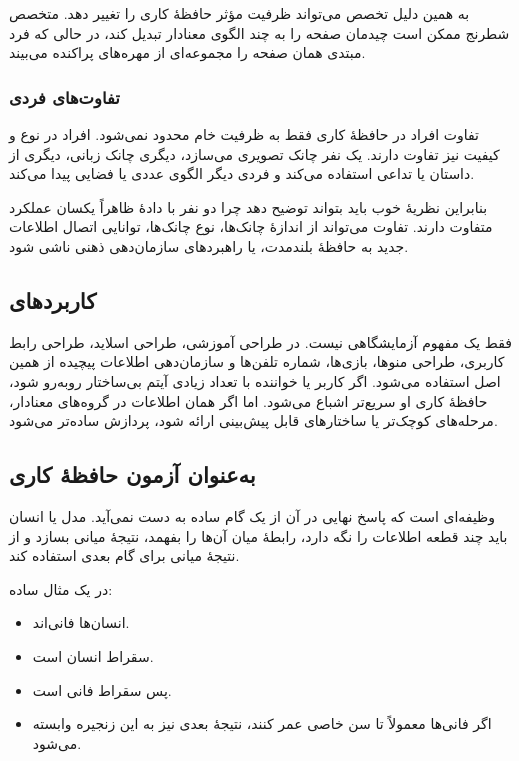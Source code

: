 به همین دلیل تخصص می‌تواند ظرفیت مؤثر حافظهٔ کاری را تغییر دهد. متخصص شطرنج ممکن است چیدمان صفحه را به چند الگوی معنادار تبدیل کند، در حالی که فرد مبتدی همان صفحه را مجموعه‌ای از مهره‌های پراکنده می‌بیند.

\subsubsection{تفاوت‌های فردی}
تفاوت افراد در حافظهٔ کاری فقط به ظرفیت خام محدود نمی‌شود. افراد در نوع و کیفیت  نیز تفاوت دارند. یک نفر چانک تصویری می‌سازد، دیگری چانک زبانی، دیگری از داستان یا تداعی استفاده می‌کند و فردی دیگر الگوی عددی یا فضایی پیدا می‌کند.

بنابراین نظریهٔ خوب باید بتواند توضیح دهد چرا دو نفر با دادهٔ ظاهراً یکسان عملکرد متفاوت دارند. تفاوت می‌تواند از اندازهٔ چانک‌ها، نوع چانک‌ها، توانایی اتصال اطلاعات جدید به حافظهٔ بلندمدت، یا راهبردهای سازمان‌دهی ذهنی ناشی شود.

\subsection{کاربردهای }
 فقط یک مفهوم آزمایشگاهی نیست. در طراحی آموزشی، طراحی اسلاید، طراحی رابط کاربری، طراحی منوها، بازی‌ها، شماره تلفن‌ها و سازمان‌دهی اطلاعات پیچیده از همین اصل استفاده می‌شود. اگر کاربر یا خواننده با تعداد زیادی آیتم بی‌ساختار روبه‌رو شود، حافظهٔ کاری او سریع‌تر اشباع می‌شود. اما اگر همان اطلاعات در گروه‌های معنادار، مرحله‌های کوچک‌تر یا ساختارهای قابل پیش‌بینی ارائه شود، پردازش ساده‌تر می‌شود.

\subsection{ به‌عنوان آزمون حافظهٔ کاری}
 وظیفه‌ای است که پاسخ نهایی در آن از یک گام ساده به دست نمی‌آید. مدل یا انسان باید چند قطعه اطلاعات را نگه دارد، رابطهٔ میان آن‌ها را بفهمد، نتیجهٔ میانی بسازد و از نتیجهٔ میانی برای گام بعدی استفاده کند.

در یک مثال ساده:
\begin{itemize}
  \item انسان‌ها فانی‌اند.
  \item سقراط انسان است.
  \item پس سقراط فانی است.
  \item اگر فانی‌ها معمولاً تا سن خاصی عمر کنند، نتیجهٔ بعدی نیز به این زنجیره وابسته می‌شود.
\end{itemize}

